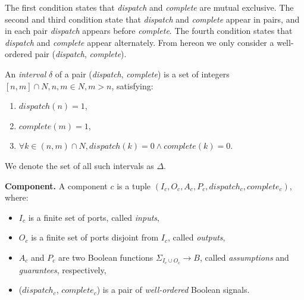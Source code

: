 The first condition states that \emph{dispatch} and \emph{complete} are mutual exclusive. The second and third condition state that \emph{dispatch} and \emph{complete} appear in pairs, and in each pair \emph{dispatch} appears before \emph{complete}. The fourth condition states that \emph{dispatch} and \emph{complete} appear alternately. 
From hereon we only consider a well-ordered pair (\emph{dispatch}, \emph{complete}).

An \emph{interval} $\delta$ of a pair (\emph{dispatch}, \emph{complete}) is a set of integers $[n, m] \cap N, n,m \in N, m>n$, satisfying:

\begin{enumerate}
	\item $ dispatch(n) = 1 $, 
	\item $ complete(m) = 1 $, 
	\item $ \forall k\in (n, m) \cap N, dispatch(k)=0 \wedge complete(k)=0 $.
\end{enumerate}

We denote the set of all such intervals as $\Delta$.

{\bf Component.}
A component $c$ is a tuple $(I_c, O_c, A_c, P_c, dispatch_c, complete_c)$, where: 

\begin{itemize}
    	\item $I_c$ is a finite set of ports, called \emph{inputs},
    	\item $O_c$ is a finite set of ports disjoint from $I_c$, called \emph{outputs},
	\item $A_c$ and $P_c$ are two Boolean functions $\Sigma_{I_c \cup O_c} \rightarrow B$, called \emph{assumptions} and \emph{guarantees}, respectively,	
    	\item ($dispatch_c$, $complete_c$) is a pair of \emph{well-ordered} Boolean signals.
\end{itemize}


